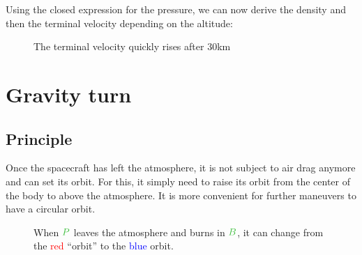 Using the closed expression for the pressure, we can now derive the
density and then the terminal velocity depending on the altitude:

\begin{figure}[H]
	\centering
	\caption{The terminal velocity quickly rises after 30km}
\end{figure}



\section{Gravity turn}


\subsection{Principle}

Once the spacecraft has left the atmosphere, it is not subject to air
drag anymore and can set its orbit. For this, it simply need to raise
its orbit from the center of the body to above the atmosphere. It is
more convenient for further maneuvers to have a circular orbit.

\begin{figure}[H]
	\centering
	\caption{
		When $\posit{P}$ leaves the atmosphere and burns in
		$\posit{B}$, it can change from the \textcolor{red}{red}
		“orbit” to the \textcolor{blue}{blue} orbit.
	}
\end{figure}


